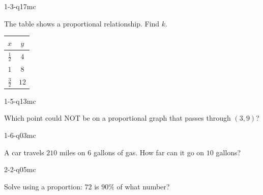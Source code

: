 
\begin{practiceQuestion}{1-3-q17}{mc}
\begin{questionText}
The table shows a proportional relationship. Find $k$.

\begin{center}
\begin{tabular}{|c|c|}
\hline $x$ & $y$ \\ \hline $\frac{1}{2}$ & $4$ \\ $1$ & $8$ \\ $\frac{3}{2}$ & $12$ \\ \hline
\end{tabular}
\end{center}
\end{questionText}
\end{practiceQuestion}

\begin{practiceQuestion}{1-5-q13}{mc}
\begin{questionText}
Which point could NOT be on a proportional graph that passes through $(3, 9)$?
\end{questionText}
\end{practiceQuestion}

\begin{practiceQuestion}{1-6-q03}{mc}
\begin{questionText}
A car travels $210$ miles on $6$ gallons of gas. How far can it go on $10$ gallons?
\end{questionText}
\end{practiceQuestion}

\begin{practiceQuestion}{2-2-q05}{mc}
\begin{questionText}
Solve using a proportion: $72$ is $90\%$ of what number?
\end{questionText}
\end{practiceQuestion}

